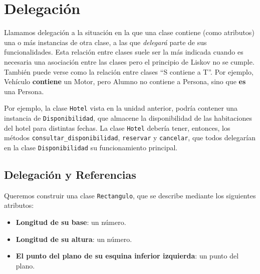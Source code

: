 \section{Delegación}

Llamamos delegación a la situación en la que una clase contiene (como
atributos) una o más instancias de otra clase, a las que {\it delegará}
parte de sus funcionalidades. Esta relación entre clases suele ser la más
indicada cuando es necesaria una asociación entre las clases pero el
principio de Liskov no se cumple. También puede verse como la relación
entre clases ``S contiene a T''. Por ejemplo, Vehículo {\bf contiene} un
Motor, pero Alumno no contiene a Persona, sino que {\bf es} una Persona.

Por ejemplo, la clase \lstinline!Hotel! vista en la unidad anterior, podría
contener una instancia de \lstinline!Disponibilidad!, que almacene la
disponibilidad de las habitaciones del hotel para distintas fechas.  La
clase \lstinline!Hotel! debería tener, entonces, los métodos
\lstinline!consultar_disponibilidad!, \lstinline!reservar! y
\lstinline!cancelar!, que todos delegarían en la clase
\lstinline!Disponibilidad! su funcionamiento principal.




\subsection*{Delegación y Referencias}

Queremos construir una clase \lstinline!Rectangulo!, que se describe
mediante los siguientes atributos:

\begin{itemize}
\item {\bf Longitud de su base}: un número.

\item {\bf Longitud de su altura}: un número.

\item {\bf El punto del plano de su esquina inferior izquierda}: un punto del plano.

\end{itemize}

